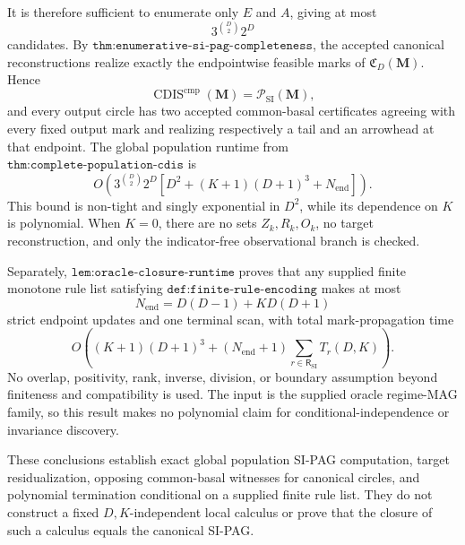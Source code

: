 It is therefore sufficient to enumerate only \(E\) and \(A\), giving at most
\[
3^{\binom D2}2^D
\]
candidates.  By \(\texttt{thm:enumerative-si-pag-completeness}\), the accepted canonical reconstructions realize exactly the endpointwise feasible marks of \(\mathfrak C_D(\mathbf M)\).  Hence
\[
\operatorname{CDIS}^{\mathrm{cmp}}(\mathbf M)=\mathcal P_{\mathrm{SI}}(\mathbf M),
\]
and every output circle has two accepted common-basal certificates agreeing with every fixed output mark and realizing respectively a tail and an arrowhead at that endpoint.  The global population runtime from \(\texttt{thm:complete-population-cdis}\) is
\[
O\!\left(
3^{\binom D2}2^D
\left[D^2+(K+1)(D+1)^3+N_{\mathrm{end}}\right]
\right).
\]
This bound is non-tight and singly exponential in \(D^2\), while its dependence on \(K\) is polynomial.  When \(K=0\), there are no sets \(Z_k,R_k,O_k\), no target reconstruction, and only the indicator-free observational branch is checked.

Separately, \(\texttt{lem:oracle-closure-runtime}\) proves that any supplied finite monotone rule list satisfying \(\texttt{def:finite-rule-encoding}\) makes at most
\[
N_{\mathrm{end}}=D(D-1)+KD(D+1)
\]
strict endpoint updates and one terminal scan, with total mark-propagation time
\[
O\!\left(
(K+1)(D+1)^3+
(N_{\mathrm{end}}+1)
\sum_{r\in\mathsf R_{\mathrm{SI}}}T_r(D,K)
\right).
\]
No overlap, positivity, rank, inverse, division, or boundary assumption beyond finiteness and compatibility is used.  The input is the supplied oracle regime-MAG family, so this result makes no polynomial claim for conditional-independence or invariance discovery.

These conclusions establish exact global population SI-PAG computation, target residualization, opposing common-basal witnesses for canonical circles, and polynomial termination conditional on a supplied finite rule list.  They do not construct a fixed \(D,K\)-independent local calculus or prove that the closure of such a calculus equals the canonical SI-PAG.